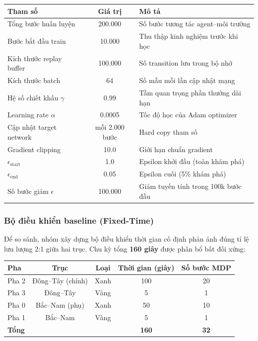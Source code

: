 \begin{center}
\begin{tabular}{|l|c|l|}
\hline
\textbf{Tham số} & \textbf{Giá trị} & \textbf{Mô tả} \\
\hline
Tổng bước huấn luyện & 200.000 & Số bước tương tác agent--môi trường \\
Bước bắt đầu train & 10.000 & Thu thập kinh nghiệm trước khi học \\
Kích thước replay buffer & 100.000 & Số transition lưu trong bộ nhớ \\
Kích thước batch & 64 & Số mẫu mỗi lần cập nhật mạng \\
Hệ số chiết khấu $\gamma$ & 0.99 & Tầm quan trọng phần thưởng dài hạn \\
Learning rate $\alpha$ & 0.0005 & Tốc độ học của Adam optimizer \\
Cập nhật target network & mỗi 2.000 bước & Hard copy tham số \\
Gradient clipping & 10.0 & Giới hạn chuẩn gradient \\
$\epsilon_{\text{start}}$ & 1.0 & Epsilon khởi đầu (toàn khám phá) \\
$\epsilon_{\text{end}}$ & 0.05 & Epsilon cuối (5\% khám phá) \\
Số bước giảm $\epsilon$ & 100.000 & Giảm tuyến tính trong 100k bước đầu \\
\hline
\end{tabular}
\end{center}

\subsubsection{Bộ điều khiển baseline (Fixed-Time)}

Để so sánh, nhóm xây dựng bộ điều khiển thời gian cố định phản ánh đúng tỉ lệ lưu lượng 2:1 giữa hai trục. Chu kỳ tổng \textbf{160 giây} được phân bổ bất đối xứng:

\begin{center}
\begin{tabular}{|l|c|c|c|c|}
\hline
\textbf{Pha} & \textbf{Trục} & \textbf{Loại} & \textbf{Thời gian (giây)} & \textbf{Số bước MDP} \\
\hline
Pha 2 & Đông--Tây (chính) & Xanh & 100 & 20 \\
Pha 3 & Đông--Tây & Vàng & 5 & 1 \\
Pha 0 & Bắc--Nam (phụ) & Xanh & 50 & 10 \\
Pha 1 & Bắc--Nam & Vàng & 5 & 1 \\
\hline
\textbf{Tổng} & & & \textbf{160} & \textbf{32} \\
\hline
\end{tabular}
\end{center}

